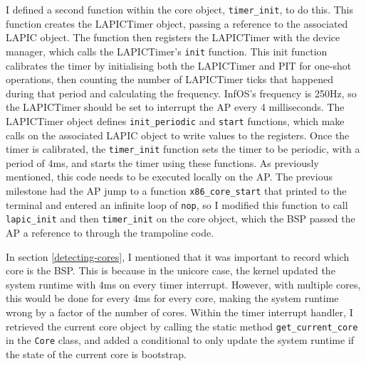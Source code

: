 \documentclass[bsc,frontabs,singlespacing,parskip,deptreport]{infthesis}
\begin{document}
I defined a second function within the core object, \verb|timer_init|, to do this. This function creates the LAPICTimer object, passing a reference to the associated LAPIC object. The function then registers the LAPICTimer with the device manager, which calls the LAPICTimer's \verb|init| function. This init function calibrates the timer by initialising both the LAPICTimer and PIT for one-shot operations, then counting the number of LAPICTimer ticks that happened during that period and calculating the frequency. InfOS's frequency is 250Hz, so the LAPICTimer should be set to interrupt the AP every 4 milliseconds. The LAPICTimer object defines \verb|init_periodic| and \verb|start| functions, which make calls on the associated LAPIC object to write values to the registers. Once the timer is calibrated, the \verb|timer_init| function sets the timer to be periodic, with a period of 4ms, and starts the timer using these functions. As previously mentioned, this code needs to be executed locally on the AP. The previous milestone had the AP jump to a function \verb|x86_core_start| that printed to the terminal and entered an infinite loop of \verb|nop|, so I modified this function to call \verb|lapic_init| and then \verb|timer_init| on the core object, which the BSP passed the AP a reference to through the trampoline code.

In section \ref{detecting-cores}, I mentioned that it was important to record which core is the BSP. This is because in the unicore case, the kernel updated the system runtime with 4ms on every timer interrupt. However, with multiple cores, this would be done for every 4ms for every core, making the system runtime wrong by a factor of the number of cores. Within the timer interrupt handler, I retrieved the current core object by calling the static method \verb|get_current_core| in the \verb|Core| class, and added a conditional to only update the system runtime if the state of the current core is bootstrap.
\end{document}
